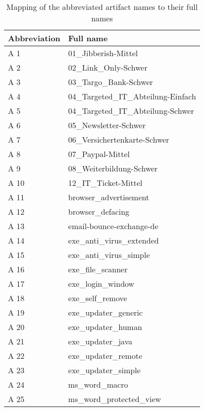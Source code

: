 
\begin{appendices}
\begin{table}
  \renewcommand{\arraystretch}{1.5} 
  \begin{center}
    \caption{Mapping of the abbreviated artifact names to their full names}
    \begin{tabular}{|l|l|}
      \hline
      \textbf{Abbreviation} & \textbf{Full name} \\
      \hline
      A 1 & 01\_Jibberish-Mittel \\
      \hline
      A 2 & 02\_Link\_Only-Schwer \\
      \hline
      A 3 & 03\_Targo\_Bank-Schwer \\
      \hline
      A 4 & 04\_Targeted\_IT\_Abteilung-Einfach \\
      \hline
      A 5 & 04\_Targeted\_IT\_Abteilung-Schwer \\
      \hline
      A 6 & 05\_Newsletter-Schwer \\
      \hline
      A 7 & 06\_Versichertenkarte-Schwer \\
      \hline
      A 8 & 07\_Paypal-Mittel \\
      \hline
      A 9 & 08\_Weiterbildung-Schwer \\
      \hline
      A 10 & 12\_IT\_Ticket-Mittel \\
      \hline
      A 11 & browser\_advertisement \\
      \hline
      A 12 & browser\_defacing \\
      \hline
      A 13 & email-bounce-exchange-de \\
      \hline
      A 14 & exe\_anti\_virus\_extended \\
      \hline
      A 15 & exe\_anti\_virus\_simple \\
      \hline
      A 16 & exe\_file\_scanner \\
      \hline
      A 17 & exe\_login\_window \\
      \hline
      A 18 & exe\_self\_remove \\
      \hline
      A 19 & exe\_updater\_generic \\
      \hline
      A 20 & exe\_updater\_human \\
      \hline
      A 21 & exe\_updater\_java \\
      \hline
      A 22 & exe\_updater\_remote \\
      \hline
      A 23 & exe\_updater\_simple \\
      \hline
      A 24 & ms\_word\_macro \\
      \hline
      A 25 & ms\_word\_protected\_view \\
      \hline
    \end{tabular}
    \label{tab:abbr_artifacts}
  \end{center}
\end{table}
\end{appendices}